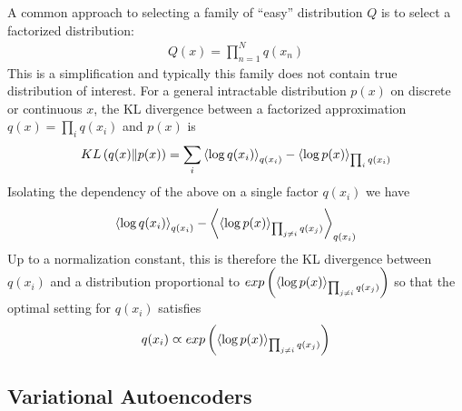 A common approach to selecting a family of ``easy'' distribution $Q$ is to select a factorized distribution:
\begin{align*}
	Q(x)=\prod_{n=1}^Nq(x_n)
\end{align*}
This is a simplification and typically this family does not contain true distribution of interest. For a general intractable distribution $p(x)$ on discrete or continuous $x$, the KL divergence between a factorized approximation $q(x)=\prod_iq(x_i)$ and $p(x)$ is
\begin{align*}
	KL\left(q(x)\|p(x)\right)=\sum_i\left\langle\log q(x_i)\right\rangle_{q(x_i)}-\left\langle\log p(x)\right\rangle_{\prod_iq(x_i)}
\end{align*}
Isolating the dependency of the above on a single factor $q(x_i)$ we have
\begin{align*}
	\left\langle\log q(x_i)\right\rangle_{q(x_i)}-\left\langle\left\langle\log p(x)\right\rangle_{\prod_{j\neq i}q(x_j)}\right\rangle_{q(x_i)}
\end{align*}
Up to a normalization constant, this is therefore the KL divergence between $q(x_i)$ and a distribution proportional to $exp\left(\left\langle\log p(x)\right\rangle_{\prod_{j\neq i}q(x_j)}\right)$ so that the optimal setting for $q(x_i)$ satisfies
\begin{align*}
	q(x_i)\varpropto exp\left(\left\langle\log p(x)\right\rangle_{\prod_{j\neq i}q(x_j)}\right)
\end{align*}

\subsection{Variational Autoencoders}
